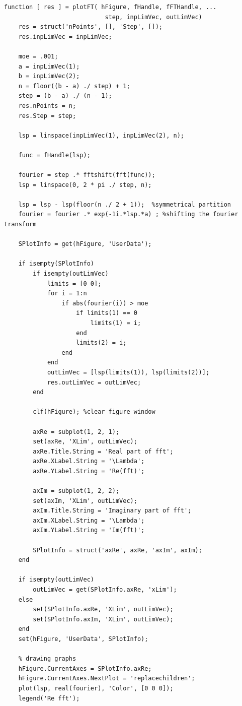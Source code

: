 \documentclass[11pt, oneside, final]{article}
\numberwithin{equation}{section}
\begin{document}
    \begin{verbatim}
function [ res ] = plotFT( hFigure, fHandle, fFTHandle, ...
                            step, inpLimVec, outLimVec)
    res = struct('nPoints', [], 'Step', []);
    res.inpLimVec = inpLimVec;

    moe = .001;
    a = inpLimVec(1);
    b = inpLimVec(2);
    n = floor((b - a) ./ step) + 1;
    step = (b - a) ./ (n - 1);
    res.nPoints = n;
    res.Step = step;

    lsp = linspace(inpLimVec(1), inpLimVec(2), n);

    func = fHandle(lsp);

    fourier = step .* fftshift(fft(func));
    lsp = linspace(0, 2 * pi ./ step, n);

    lsp = lsp - lsp(floor(n ./ 2 + 1));  %symmetrical partition
    fourier = fourier .* exp(-1i.*lsp.*a) ; %shifting the fourier transform

    SPlotInfo = get(hFigure, 'UserData');

    if isempty(SPlotInfo)
        if isempty(outLimVec)
            limits = [0 0];
            for i = 1:n
                if abs(fourier(i)) > moe
                    if limits(1) == 0
                        limits(1) = i;
                    end
                    limits(2) = i;
                end
            end
            outLimVec = [lsp(limits(1)), lsp(limits(2))];
            res.outLimVec = outLimVec;
        end
    
        clf(hFigure); %clear figure window
    
        axRe = subplot(1, 2, 1);
        set(axRe, 'XLim', outLimVec);
        axRe.Title.String = 'Real part of fft';
        axRe.XLabel.String = '\Lambda';
        axRe.YLabel.String = 'Re(fft)';
    
        axIm = subplot(1, 2, 2);
        set(axIm, 'XLim', outLimVec);
        axIm.Title.String = 'Imaginary part of fft';
        axIm.XLabel.String = '\Lambda';
        axIm.YLabel.String = 'Im(fft)';
   
        SPlotInfo = struct('axRe', axRe, 'axIm', axIm);
    end

    if isempty(outLimVec)
        outLimVec = get(SPlotInfo.axRe, 'xLim');
    else
        set(SPlotInfo.axRe, 'XLim', outLimVec);
        set(SPlotInfo.axIm, 'XLim', outLimVec);
    end
    set(hFigure, 'UserData', SPlotInfo);

    % drawing graphs
    hFigure.CurrentAxes = SPlotInfo.axRe;
    hFigure.CurrentAxes.NextPlot = 'replacechildren';
    plot(lsp, real(fourier), 'Color', [0 0 0]); 
    legend('Re fft');
 

\end{verbatim}
\end{document}
